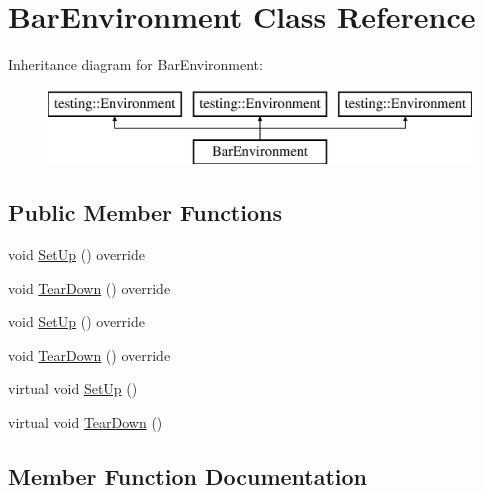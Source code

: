 \hypertarget{class_bar_environment}{}\section{Bar\+Environment Class Reference}
\label{class_bar_environment}
Inheritance diagram for Bar\+Environment\+:\begin{figure}[H]
\begin{center}
\leavevmode
\includegraphics[height=2.000000cm]{d7/de7/class_bar_environment}
\end{center}
\end{figure}
\subsection*{Public Member Functions}
\begin{DoxyCompactItemize}
\item 
void \mbox{\hyperlink{class_bar_environment_a8c525317fe8067f5000475cf4689da09}{Set\+Up}} () override
\item 
void \mbox{\hyperlink{class_bar_environment_ac02b15d5b27e33232c578f0340442bbb}{Tear\+Down}} () override
\item 
void \mbox{\hyperlink{class_bar_environment_a8c525317fe8067f5000475cf4689da09}{Set\+Up}} () override
\item 
void \mbox{\hyperlink{class_bar_environment_ac02b15d5b27e33232c578f0340442bbb}{Tear\+Down}} () override
\item 
virtual void \mbox{\hyperlink{class_bar_environment_a88e17c5dd1dcea7a4538f2f3c6bf7bdd}{Set\+Up}} ()
\item 
virtual void \mbox{\hyperlink{class_bar_environment_a384f951da72a2a18bb0c2b3506376b09}{Tear\+Down}} ()
\end{DoxyCompactItemize}


\subsection{Member Function Documentation}
\mbox{\label{class_bar_environment_a88e17c5dd1dcea7a4538f2f3c6bf7bdd}} 
